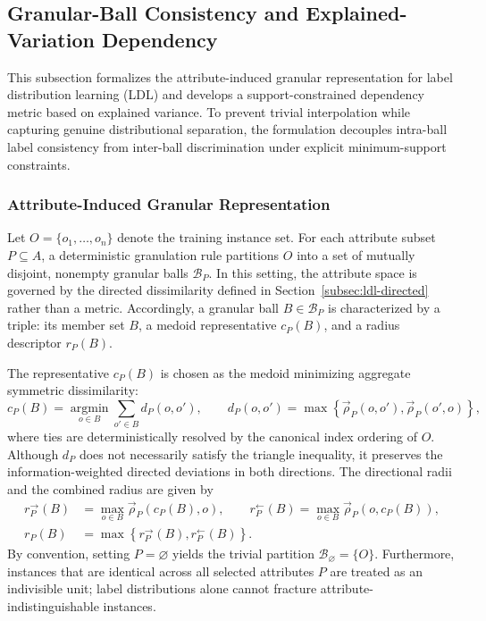 \subsection{Granular-Ball Consistency and Explained-Variation Dependency}
\label{subsec:ldl-dependency}
This subsection formalizes the attribute-induced granular representation for label distribution learning (LDL) and develops a support-constrained dependency metric based on explained variance. To prevent trivial interpolation while capturing genuine distributional separation, the formulation decouples intra-ball label consistency from inter-ball discrimination under explicit minimum-support constraints.

\subsubsection{Attribute-Induced Granular Representation}
Let $O = \{o_1, \dots, o_n\}$ denote the training instance set. For each attribute subset $P \subseteq A$, a deterministic granulation rule partitions $O$ into a set of mutually disjoint, nonempty granular balls $\mathcal{B}_P$. In this setting, the attribute space is governed by the directed dissimilarity defined in Section~\ref{subsec:ldl-directed} rather than a metric. Accordingly, a granular ball $B \in \mathcal{B}_P$ is characterized by a triple: its member set $B$, a medoid representative $c_P(B)$, and a radius descriptor $r_P(B)$.

The representative $c_P(B)$ is chosen as the medoid minimizing aggregate symmetric dissimilarity:
\begin{equation}
	c_P(B) = \underset{o \in B}{\operatorname{argmin}} \sum_{o' \in B} d_P(o, o'), \qquad
	d_P(o, o') = \max\left\{\overrightarrow{\rho}_P(o, o'), \overrightarrow{\rho}_P(o', o)\right\},
	\label{eq:medoid-selection}
\end{equation}
where ties are deterministically resolved by the canonical index ordering of $O$. Although $d_P$ does not necessarily satisfy the triangle inequality, it preserves the information-weighted directed deviations in both directions. The directional radii and the combined radius are given by
\begin{align}
	r_P^{\to}(B) &= \max_{o \in B} \overrightarrow{\rho}_P(c_P(B), o), \qquad
	r_P^{\leftarrow}(B) = \max_{o \in B} \overrightarrow{\rho}_P(o, c_P(B)), \\
	r_P(B) &= \max\left\{r_P^{\to}(B), r_P^{\leftarrow}(B)\right\}.
\end{align}
By convention, setting $P = \varnothing$ yields the trivial partition $\mathcal{B}_\varnothing = \{O\}$. Furthermore, instances that are identical across all selected attributes $P$ are treated as an indivisible unit; label distributions alone cannot fracture attribute-indistinguishable instances.


